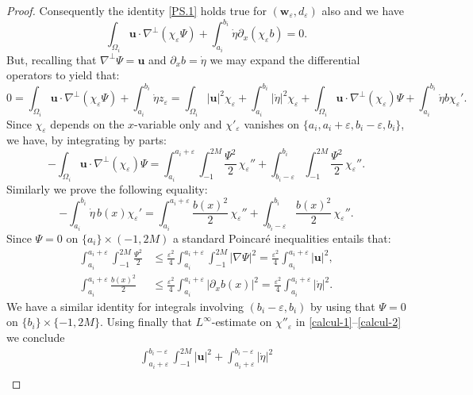 \documentclass[11pt]{article}
\theoremstyle{remark}
\theoremstyle{definition}
\newcommand{\ug}{\boldsymbol{u}}
\newcommand{\wg}{\boldsymbol{w}}
\let\CM\Omega
\newcommand{\etap}{\dot{\eta}}
\begin{document}
\begin{proof}
Consequently the identity \eqref{PS.1} holds true for $(\wg_{\varepsilon},d_{\varepsilon})$ also and we have
\[
\int_{\CM_{i}}\ug\cdot\nabla^{\perp}(\chi_{\varepsilon}\Psi) + \int_{a_{i}}^{b_{i}}\etap \partial_x (\chi_{\varepsilon} b)=0.
\]
But, recalling that $\nabla^{\bot} \Psi = \ug$ and $\partial_x b = \dot{\eta}$ we may expand the differential operators to yield that:
\[
0 = \int_{\CM_{i}}\ug\cdot\nabla^{\perp}(\chi_{\varepsilon}\Psi) + \int_{a_{i}}^{b_{i}}\etap z_\varepsilon=\int_{\CM_{i}}\vert\ug\vert^{2}\chi_\varepsilon + \int_{a_{i}}^{b_{i}}\vert\etap\vert^{2}\chi_\varepsilon + \int_{\CM_{i}}\ug\cdot\nabla^{\perp}(\chi_{\varepsilon})\Psi + \int_{a_{i}}^{b_{i}}\etap b{\chi}_{\varepsilon}'.
\]
Since $\chi_{\varepsilon}$ depends on the $x$-variable only and $\chi'_{\varepsilon}$ vanishes on $\{a_i,a_i+ \varepsilon,b_i-\varepsilon,b_i\}$, we have, by integrating by parts:
\begin{equation}\label{calcul-1}
-\int_{\CM_{i}}\ug\cdot\nabla^{\perp}(\chi_{\varepsilon})\Psi=\int_{a_i}^{a_i+\varepsilon} \int_{-1}^{2M} \frac{\Psi^{2}}{2}\,{\chi}_{\varepsilon}''
+ \int_{b_i-\varepsilon}^{b_i} \int_{-1}^{2M} \frac{\Psi^{2}}{2}\,{\chi}_{\varepsilon}''.
\end{equation}
Similarly we prove the following equality:
\begin{equation}\label{calcul-2}-\int_{a_{i}}^{b_{i}}\etap\,b(x) {\chi}_{\varepsilon}'=
\int_{a_i}^{a_i+\varepsilon}\frac{b(x)^{2}}{2}\,{{\chi}_{\varepsilon}''}
+\int_{b_i-\varepsilon}^{b_i}\frac{b(x)^{2}}{2}\,{{\chi}_{\varepsilon}''}.
\end{equation}
Since $\Psi=0$ on $\{a_{i}\}\times(-1,2M)$
a standard Poincaré inequalities entails that:
\[\begin{aligned}
\int_{a_{i}}^{a_i+\varepsilon} \int_{-1}^{2M} \frac{\Psi^{2}}{2}&\leq \frac{\varepsilon^{2}}{4}\int_{a_{i}}^{a_i+\varepsilon} \int_{-1}^{2M}\vert\nabla\Psi\vert^{2}=\frac{\varepsilon^{2}}{4}\int_{a_{i}}^{a_i+\varepsilon}\vert\ug\vert^{2},\\
\int_{a_{i}}^{a_i+\varepsilon}\frac{b(x)^{2}}{2}&\leq\frac{\varepsilon^{2}}{4}\int_{a_{i}}^{a_i+\varepsilon}\left|\partial_{x}b(x)\right|^{2}=\frac{\varepsilon^{2}}{4}\int_{a_{i}}^{a_i+\varepsilon}\vert\etap\vert^{2}.
\end{aligned}
\]
We have a similar identity for integrals involving $(b_i-\varepsilon,b_i)$ by using that $\Psi = 0$ on $\{b_i\} \times \{-1,2M\}$. Using finally that $L^{\infty}$-estimate on ${\chi}''_{\varepsilon}$ in \eqref{calcul-1}--\eqref{calcul-2} we conclude
\begin{multline}\label{calcul-3}\int_{a_i+\varepsilon}^{b_i-\varepsilon} \int_{-1}^{2M} \vert\ug\vert^{2}+\int_{a_{i}+\varepsilon}^{b_{i}-\varepsilon}\vert\etap\vert^{2} \\

\end{multline}
\end{proof}
\end{document}
